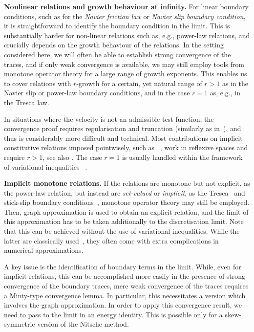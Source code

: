 \documentclass[reqno,a4paper]{amsart}
\begin{document}
	\textbf{Nonlinear relations {and growth behaviour at infinity}.} 
	For linear boundary conditions, such as for the \emph{Navier friction law} or \emph{Navier slip boundary condition}, it is straightforward to identify the boundary condition in the limit. This is substantially harder for non-linear relations such as, e.g., power-law relations, and crucially depends on the growth behaviour of the relations. 
	In the setting considered here, we will often be able to establish strong convergence of the traces, and if only weak convergence is available, we may still employ tools from monotone operator theory for a large range of growth exponents. 
	This enables us to cover relations with $r$-growth for a certain, yet natural range of $r>1$ as in the Navier slip or power-law boundary conditions, and in the case $r=1$ as, e.g., in the Tresca law. 
	
	In situations where the velocity is not an admissible test function, the convergence proof requires regularisation and truncation (similarly as in~\cite{DieningRuzickaWolf2010,BulicekGwiazdaMalekEtAl2012,DieningKreuzerSueli2013}), and thus is considerably more difficult and technical. 
	Most contributions on implicit constitutive relations imposed pointwisely, such as ~\cite{Abbatiello2021}, work in reflexive spaces and require $r>1$, see also \cite{BM.2017,MZ.2018}.  
	The case $r = 1$ is usually handled within the framework of variational inequalities ~\cite{Fuj.1994,LeRoux.2005}. 
	\medskip
	
	\textbf{Implicit monotone relations.} 
	If the relations are monotone but not explicit, as the power-law relation, but instead are \emph{set-valued} or \emph{implicit},  as the Tresca~\cite{Fuj.1994} and stick-slip boundary conditions~\cite{BulicekMalek2016,BulicekMalekMaringova2023}, monotone operator theory may still be employed. 
	Then, graph approximation is used  to obtain an explicit relation, and the limit of this approximation has to be taken additionally to the discretisation limit. 
	Note that this can be achieved without the use of variational inequalities. 
	While the latter are classically used~\cite{Duvaut1976, Glowinski2008}, they often come with extra complications in numerical approximations. 	
	
	{A key issue is the identification of boundary terms in the limit. While, even for implicit relations, this can be accomplished more easily in the presence of strong convergence of the boundary traces, mere weak convergence of the traces requires a Minty-type convergence lemma. 
		In particular, this necessitates a version which involves the graph approximation. In order to  apply this convergence result, we need to pass to the limit in an energy identity. 
		This is possible only for a skew-symmetric version of the Nitsche method. 
	}
	\medskip
	
\end{document}
